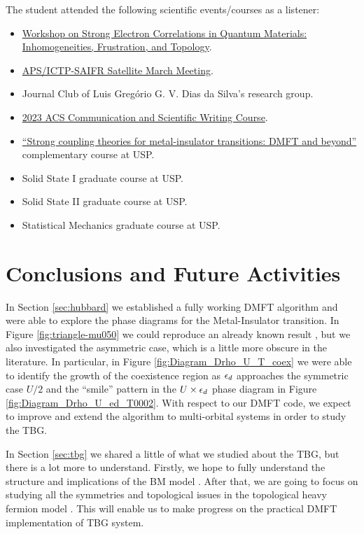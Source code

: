 \documentclass[12pt]{report}
\begin{document}
The student attended the following scientific events/courses as a listener:

\begin{itemize}
\item \href{https://www.ictp-saifr.org/qm2023/}{Workshop on Strong Electron Correlations in Quantum Materials: Inhomogeneities, Frustration, and Topology}.
\item \href{https://www.ictp-saifr.org/apsmarch23/}{APS/ICTP-SAIFR Satellite March Meeting}.
\item Journal Club of Luis Gregório G. V. Dias da Silva's research group.
\item \href{https://american-chemical-society.zoom.us/webinar/register/WN_FISEv0_ySkK2jPVB0nbsRw#/registration}{2023 ACS Communication and Scientific Writing Course}.
\item \href{https://uspdigital.usp.br/janus/componente/disciplinasOferecidasInicial.jsf?action=3&sgldis=PGF5891&idioma=en}{``Strong coupling theories for metal-insulator transitions: DMFT and beyond''} complementary course at USP.
\item Solid State I graduate course at USP.
\item Solid State II graduate course at USP.
\item Statistical Mechanics graduate course at USP.
\end{itemize}


\chapter{Conclusions and Future Activities} \label{chp:conclusions}

In Section \ref{sec:hubbard} we established a fully working DMFT algorithm and were able to explore the phase diagrams for the Metal-Insulator transition. In Figure \ref{fig:triangle-mu050} we could reproduce an already known result \cite{georges1996}, but we also investigated the asymmetric case, which is a little more obscure in the literature. In particular, in Figure \ref{fig:Diagram_Drho_U_T_coex} we were able to identify the growth of the coexistence region as $\epsilon_d$ approaches the symmetric case $U/2$ and the ``smile'' pattern in the $U \times \epsilon_d$ phase diagram in Figure \ref{fig:Diagram_Drho_U_ed_T0002}. With respect to our DMFT code, we expect to improve and extend the algorithm to multi-orbital systems in order to study the TBG.

In Section \ref{sec:tbg} we shared a little of what we studied about the TBG, but there is a lot more to understand. Firstly, we hope to fully understand the structure and implications of the BM model \cite{macdonald2011}. After that, we are going to focus on studying all the symmetries and topological issues in the topological heavy fermion model \cite{topoheavyfermion2022}. This will enable us to make progress on the practical DMFT implementation of TBG system.

%




\end{document}
